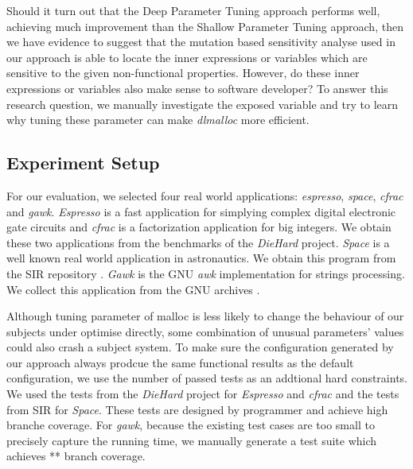 Should it turn out that the Deep Parameter Tuning approach performs well, achieving much improvement than the Shallow Parameter Tuning approach, then we have evidence to suggest that the mutation based sensitivity analyse used in our approach is able to locate the inner expressions or variables which are sensitive to the given non-functional properties. However, do these inner expressions or variables also make sense to software developer? To answer this research question, we manually investigate the exposed variable and try to learn why tuning these parameter can make \emph{dlmalloc} more efficient.  

\subsection{Experiment Setup}


\begin{table}[htbp]
\centering
\caption{subject applications}
\label{tab_sub_app}
\end{table}

For our evaluation, we selected four real world applications: \emph{espresso}, \emph{space}, \emph{cfrac} and \emph{gawk}. \emph{Espresso} is a fast application for simplying complex digital electronic gate circuits and \emph{cfrac} is a factorization application for big integers. We obtain these two applications from the benchmarks of the \emph{DieHard} project\cite{Berger:2006:DPM:1133255.1134000}. \emph{Space} is a well known real world application in astronautics. We obtain this program from the SIR repository \cite{SIR2005}. \emph{Gawk} is the GNU \emph{awk} implementation for strings processing. We collect this application from the GNU archives \cite{}.

Although tuning parameter of malloc is less likely to change the behaviour of our subjects under optimise directly, some combination of unusual parameters' values could also crash a subject system. To make sure the configuration generated by our approach always prodcue the same functional results as the default configuration, we use the number of passed tests as an addtional hard constraints. We used the tests from the \emph{DieHard} project for \emph{Espresso} and \emph{cfrac} and the tests from SIR for \emph{Space}. These tests are designed by programmer and achieve high branche coverage. For \emph{gawk}, because the existing test cases are too small to precisely capture the running time, we manually generate a test suite which achieves ** branch coverage.

